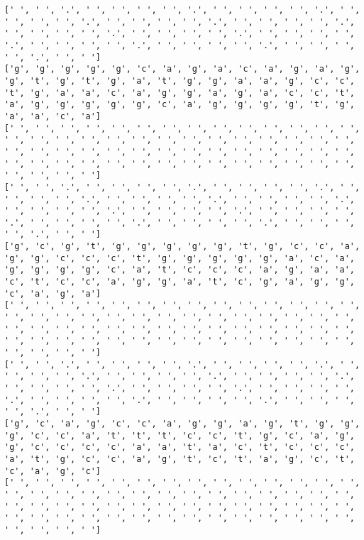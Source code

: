 \documentclass{article}
\begin{document}
\begin{Verbatim}
[' ', ' ', '.', ' ', ' ', ' ', ' ', '.', ' ', ' ', ' ', ' ', '.', ' ', ' ', ' ', ' ', '.', ' ', ' ', ' ', ' ', '.', ' ', ' ', ' ', ' ', '.', ' ', ' ', ' ', ' ', '.', ' ', ' ', ' ', ' ', '.', ' ', ' ', ' ', ' ', '.', ' ', ' ', ' ', ' ', '.', ' ', ' ', ' ', ' ', '.', ' ', ' ', ' ', ' ', '.', ' ', ' ']
['g', 'g', 'g', 'g', 'g', 'c', 'a', 'g', 'a', 'c', 'a', 'g', 'a', 'g', 'g', 't', 'g', 't', 'g', 'a', 't', 'g', 'g', 'a', 'a', 'g', 'c', 'c', 't', 'g', 'a', 'a', 'c', 'a', 'g', 'g', 'a', 'g', 'a', 'c', 'c', 't', 'a', 'g', 'g', 'g', 'g', 'g', 'c', 'a', 'g', 'g', 'g', 'g', 't', 'g', 'a', 'a', 'c', 'a']
[' ', ' ', ' ', ' ', ' ', ' ', ' ', ' ', ' ', ' ', ' ', ' ', ' ', ' ', ' ', ' ', ' ', ' ', ' ', ' ', ' ', ' ', ' ', ' ', ' ', ' ', ' ', ' ', ' ', ' ', ' ', ' ', ' ', ' ', ' ', ' ', ' ', ' ', ' ', ' ', ' ', ' ', ' ', ' ', ' ', ' ', ' ', ' ', ' ', ' ', ' ', ' ', ' ', ' ', ' ', ' ', ' ', ' ', ' ', ' ']
[' ', ' ', '.', ' ', ' ', ' ', ' ', '.', ' ', ' ', ' ', ' ', '.', ' ', ' ', ' ', ' ', '.', ' ', ' ', ' ', ' ', '.', ' ', ' ', ' ', ' ', '.', ' ', ' ', ' ', ' ', '.', ' ', ' ', ' ', ' ', '.', ' ', ' ', ' ', ' ', '.', ' ', ' ', ' ', ' ', '.', ' ', ' ', ' ', ' ', '.', ' ', ' ', ' ', ' ', '.', ' ', ' ']
['g', 'c', 'g', 't', 'g', 'g', 'g', 'g', 'g', 't', 'g', 'c', 'c', 'a', 'g', 'g', 'c', 'c', 'c', 't', 'g', 'g', 'g', 'g', 'g', 'a', 'c', 'a', 'g', 'g', 'g', 'g', 'c', 'a', 't', 'c', 'c', 'c', 'a', 'g', 'a', 'a', 'c', 't', 'c', 'c', 'a', 'g', 'g', 'a', 't', 'c', 'g', 'a', 'g', 'g', 'c', 'a', 'g', 'a']
[' ', ' ', ' ', ' ', ' ', ' ', ' ', ' ', ' ', ' ', ' ', ' ', ' ', ' ', ' ', ' ', ' ', ' ', ' ', ' ', ' ', ' ', ' ', ' ', ' ', ' ', ' ', ' ', ' ', ' ', ' ', ' ', ' ', ' ', ' ', ' ', ' ', ' ', ' ', ' ', ' ', ' ', ' ', ' ', ' ', ' ', ' ', ' ', ' ', ' ', ' ', ' ', ' ', ' ', ' ', ' ', ' ', ' ', ' ', ' ']
[' ', ' ', '.', ' ', ' ', ' ', ' ', '.', ' ', ' ', ' ', ' ', '.', ' ', ' ', ' ', ' ', '.', ' ', ' ', ' ', ' ', '.', ' ', ' ', ' ', ' ', '.', ' ', ' ', ' ', ' ', '.', ' ', ' ', ' ', ' ', '.', ' ', ' ', ' ', ' ', '.', ' ', ' ', ' ', ' ', '.', ' ', ' ', ' ', ' ', '.', ' ', ' ', ' ', ' ', '.', ' ', ' ']
['g', 'c', 'a', 'g', 'c', 'c', 'a', 'g', 'g', 'a', 'g', 't', 'g', 'g', 'g', 'c', 'c', 'a', 't', 't', 't', 'c', 'c', 't', 'g', 'c', 'a', 'g', 'g', 'c', 'c', 'c', 'c', 'a', 'a', 't', 'a', 'c', 't', 'c', 'c', 'c', 'a', 't', 'g', 'c', 'c', 'a', 'g', 't', 'c', 't', 'a', 'g', 'c', 't', 'c', 'a', 'g', 'c']
[' ', ' ', ' ', ' ', ' ', ' ', ' ', ' ', ' ', ' ', ' ', ' ', ' ', ' ', ' ', ' ', ' ', ' ', ' ', ' ', ' ', ' ', ' ', ' ', ' ', ' ', ' ', ' ', ' ', ' ', ' ', ' ', ' ', ' ', ' ', ' ', ' ', ' ', ' ', ' ', ' ', ' ', ' ', ' ', ' ', ' ', ' ', ' ', ' ', ' ', ' ', ' ', ' ', ' ', ' ', ' ', ' ', ' ', ' ', ' ']

\end{Verbatim}
\end{document}

